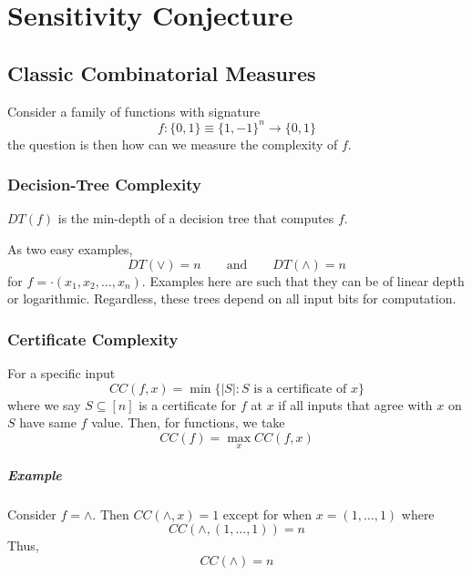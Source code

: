 \chapter{Sensitivity Conjecture}

\section{Classic Combinatorial Measures}
Consider a family of functions with signature
\begin{equation}
	f: \{ 0, 1\} \equiv \{ 1, -1\} ^n \rightarrow \{ 0, 1\} 
\end{equation}
the question is then how can we measure the complexity of $f$. 

\subsection{Decision-Tree Complexity}
\begin{definition}
	$DT(f)$ is the min-depth of a decision tree that computes $f$.
\end{definition}

As two easy examples, 
\begin{equation}
	DT(\lor) = n \quad \quad \text{and} \quad \quad DT(\land) = n
\end{equation}
for $f = \cdot (x_1, x_2, \dots, x_n)$. Examples here are such that they can be of linear depth or logarithmic. Regardless, these trees depend on all input bits for computation. 


\subsection{Certificate Complexity}
\begin{definition}
	For a specific input
	\begin{equation}
		CC(f, x) = \min\{ |S|: S \text{ is a certificate of $x$} \}
	\end{equation}
	where we say $S\subseteq [n]$ is a certificate for $f$ at $x$ if all inputs that agree with $x$ on $S$ have same $f$ value. Then, for functions, we take
	\begin{equation}
		CC(f) = \max_x CC(f, x)
	\end{equation}
\end{definition}

\paragraph{Example}
Consider $f = \land$. Then $CC(\land, x) = 1$ except for when $x = (1, \dots, 1)$ where 
\begin{equation}
	CC(\land, (1, \dots, 1)) = n
\end{equation}
Thus, 
\begin{equation}
	CC(\land) = n
\end{equation}

